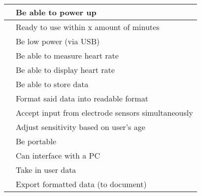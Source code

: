 \documentclass[a4paper]{article}
\begin{document}
\begin{flushleft}
\tabletail{}
\tablelasttail{}
\begin{supertabular}{|m{2.8899999cm}|m{8.253cm}|}
\hline
{} &
{\color{black} Be able to power up}\\\hline
{} &
{\color{black} Ready to use within x amount of minutes}\\\hline
{} &
{\color{black} Be low power (via USB)}\\\hline
{} &
{\color{black} Be able to measure heart rate}\\\hline
{} &
{\color{black} Be able to display heart rate}\\\hline
{} &
{\color{black} Be able to store data}\\\hline
{} &
{\color{black} Format said data into readable format}\\\hline
{} &
{\color{black} Accept input from electrode sensors simultaneously}\\\hline
{} &
{\color{black} Adjust sensitivity based on user's age}\\\hline
{} &
{\color{black} Be portable}\\\hline
{} &
{\color{black} Can interface with a PC}\\\hline
{} &
{\color{black} Take in user data }\\\hline
{} &
{\color{black} Export formatted data (to document)}\\\hline

\end{supertabular}
\end{flushleft}
\end{document}
